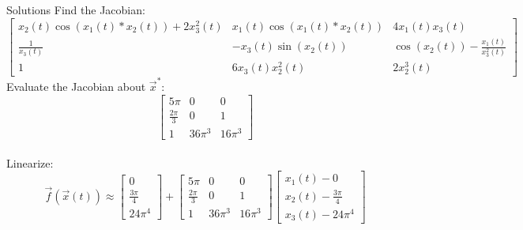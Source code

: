 \documentclass{beamer}
\begin{document}
	\begin{frame}{Solutions}
	 Find the Jacobian: 
	\small
	\[
	        \begin{bmatrix}
	        x_2(t)\cos(x_1(t)*x_2(t)) + 2x_3^2(t)& x_1(t)\cos(x_1(t)*x_2(t)) & 4x_1(t)x_3(t)\\ 
	        \frac{1}{x_3(t)}& -x_3(t)\sin(x_2(t)) &\cos(x_2(t)) - \frac{x_1(t)}{x_3^2(t)}  \\ 
	        1 & 6x_3(t)x_2^2(t)& 2 x_2^3(t) 
	        \end{bmatrix}
	\]
	\normalsize
	Evaluate the Jacobian about $\vec{x}^*$:
	\[
	        \begin{bmatrix}
	       5 \pi & 0 & 0\\
	       \frac{2 \pi }{3}& 0 & 1\\
	       1 & 36 \pi^3 & 16 \pi^3
	        \end{bmatrix}
	\]
	\\
	Linearize:
	\begin{equation*}
	 \vec{f}(\vec{x}(t)) \approx 
	 \begin{bmatrix}
	 0 \\ \frac{3\pi }{4} \\ 24 \pi^4
	 \end{bmatrix} +
	 \begin{bmatrix}
	       5 \pi & 0 & 0\\
	       \frac{2 \pi }{3}& 0 & 1\\
	       1 & 36 \pi^3 & 16 \pi^3
	 \end{bmatrix}
	 \begin{bmatrix}
	 x_1(t) - 0 \\ x_2(t) - \frac{3\pi }{4} \\ x_3(t) - 24 \pi^4
	 \end{bmatrix}
	\end{equation*}

	\end{frame}
\end{document}

